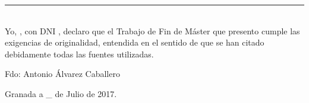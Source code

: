 \noindent\rule[-1ex]{\textwidth}{2pt}\\[4.5ex]

Yo, \textbf{\myName}, con DNI \dni, declaro que
el Trabajo de Fin de Máster que presento cumple las exigencias de originalidad,
entendida en el sentido de que se han citado debidamente todas las fuentes
utilizadas.

\vspace{6cm}

\noindent Fdo: Antonio Álvarez Caballero

\vspace{2cm}

\begin{flushright}
Granada a \_ de Julio de 2017.
\end{flushright}


%
%
%
%
%
%
%
%
%
%
%
%

%
%
%
%
%
%
